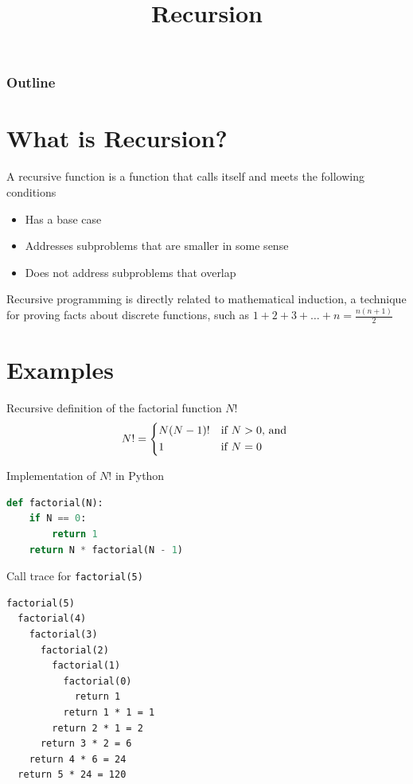 \documentclass[8pt,a4paper,compress]{beamer}
\title{Recursion}
\date{}
\begin{document}
\begin{frame}
\vfill
\titlepage
\end{frame}

\begin{frame}
\frametitle{Outline}
\tableofcontents
\end{frame}

\section{What is Recursion?}
\begin{frame}[fragile]
\pause

A recursive function is a function that calls itself and meets the following conditions
\begin{itemize}
\item Has a base case
\item Addresses subproblems that are smaller in some sense
\item Does not address subproblems that overlap
\end{itemize}

\pause
\bigskip

Recursive programming is directly related to mathematical induction, a technique for proving facts about discrete functions, such as $1 + 2 + 3 + \dots + n = \frac{n(n+1)}{2}$
\end{frame}

\section{Examples}
\begin{frame}[fragile]
\pause

Recursive definition of the factorial function $N!$ 
\[
N! = \begin{dcases*}
N(N-1)! & if $N > 0$, and \\
1       & if $N=0$
\end{dcases*}
\]

\pause
\bigskip

Implementation of $N!$ in Python

\begin{lstlisting}[language=Python]
def factorial(N):
    if N == 0:
        return 1
    return N * factorial(N - 1)
\end{lstlisting}

\pause
\bigskip

Call trace for \lstinline{factorial(5)}
\begin{lstlisting}[language={}]
factorial(5)
  factorial(4)
    factorial(3)
      factorial(2)
        factorial(1)
          factorial(0)
            return 1
          return 1 * 1 = 1            
        return 2 * 1 = 2
      return 3 * 2 = 6
    return 4 * 6 = 24
  return 5 * 24 = 120
\end{lstlisting}
\end{frame}
\end{document}
